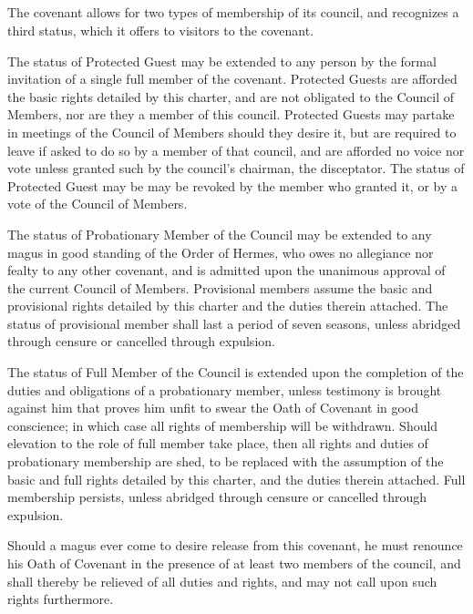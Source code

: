 \documentclass [a4paper,portrait]{article}
\begin{document}
\begin{multicols}{2}
\section*{\fontsize{30}{35}\selectfont{Membership}}
\thispagestyle{empty}
\begin{small}
	The covenant allows for two types of membership of its council, and recognizes a third status, which it
	offers to visitors to the covenant.
	
	The status of Protected Guest may be extended to any person by the formal invitation of a single full 
	member of the covenant. Protected Guests are afforded the basic rights detailed by this charter, and 
	are not obligated to the Council of Members, nor are they a member of this council. Protected Guests 
	may partake in meetings of the Council of Members should they desire it, but are required to leave if 
	asked to do so by a member of that council, and are afforded no voice nor vote unless granted such by 
	the council’s chairman, the disceptator. The status of Protected Guest may be may be revoked by the 
	member who granted it, or by a vote of the Council of Members.
	
	The status of Probationary Member of the Council may be extended to any magus in good standing of the 
	Order of Hermes, who owes no allegiance nor fealty to any other covenant, and is admitted upon the 
	unanimous approval of the current Council of Members. Provisional members assume the basic and 
	provisional rights detailed by this charter and the duties therein attached. The status of provisional 
	member shall last a period of seven seasons, unless abridged through censure or cancelled through 
	expulsion.
	
	The status of Full Member of the Council is extended upon the completion of the duties and obligations 
	of a probationary member, unless testimony is brought against him that proves him unfit to swear the 
	Oath of Covenant in good conscience; in which case all rights of membership will be withdrawn. Should 
	elevation to the role of full member take place, then all rights and duties of probationary membership 
	are shed, to be replaced with the assumption of the basic and full rights detailed by this charter, and 
	the duties therein attached. Full membership persists, unless abridged through censure or cancelled 
	through expulsion.
	
	Should a magus ever come to desire release from this covenant, he must renounce his Oath of Covenant in
	the presence of at least two members of the council, and shall thereby be relieved of all duties and 
	rights, and may not call upon such rights furthermore.
	
\end{small}
\end{multicols}
\newpage
\end{document}
